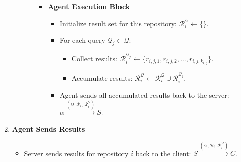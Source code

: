\documentclass[11pt]{article}
\begin{document}
\begin{enumerate}
\begin{itemize}
\begin{itemize}
\begin{itemize}
      \item \textbf{\textbf{Agent Execution Block}}
        \begin{itemize}
        \item Initialize result set for this repository: \(\mathcal{R}_i^{\mathcal{Q}} \gets \{\}\).
        \item For each query \(\mathcal{Q}_j \in \mathcal{Q}\):
          \begin{itemize}
          \item Collect results:  
            \(\mathcal{R}_i^{\mathcal{Q}_j} \gets \{ r_{i,j,1}, r_{i,j,2}, \dots, r_{i,j,k_{i,j}} \}\).
          \item Accumulate results:  
            \(\mathcal{R}_i^{\mathcal{Q}} \gets \mathcal{R}_i^{\mathcal{Q}} \cup \mathcal{R}_i^{\mathcal{Q}_j}\).
          \end{itemize}
        \item Agent sends all accumulated results back to the server:  
          \(\alpha \xrightarrow{(\mathcal{Q}, \mathcal{R}_i, \mathcal{R}_i^{\mathcal{Q}})} S\).
        \end{itemize}
      \end{itemize}
    \end{itemize}
  \end{itemize}

\item \textbf{\textbf{Agent Sends Results}}
  \begin{itemize}
  \item Server sends results for repository \(i\) back to the client:  
    \(S \xrightarrow{(\mathcal{Q}, \mathcal{R}_i, \mathcal{R}_i^{\mathcal{Q}})} C\).
  \end{itemize}
\end{enumerate}
\end{document}

